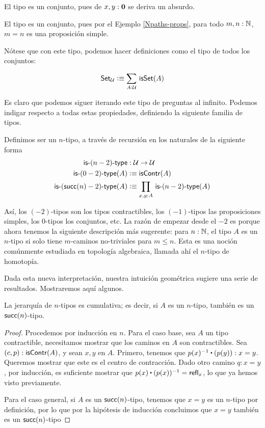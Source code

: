 \documentclass[../main.tex]{subfiles}
\begin{document}
\begin{example}
  El tipo \emptyt es un conjunto, pues de $x,y:\mathbf{0}$ se deriva un absurdo.
\end{example}

\begin{example}
  El tipo \N es un conjunto, pues por el Ejemplo \ref{Npaths-props}, para todo $m,n:\mathbb{N}$, $m=n$ es una proposici\'on simple.
\end{example}

N\'otese que con este tipo, podemos hacer definiciones como el tipo de todos los conjuntos:

\[ \mathsf{Set}_{\UU} \defeq \sm{A:\UU} \isset(A) \]

Es claro que podemos siguer iterando este tipo de preguntas al infinito.
Podemos indigar respecto a todas estas propiedades, definiendo la siguiente familia de tipos.
\begin{definition}
  Definimos ser un $n$-tipo, a trav\'es de recursi\'on en los naturales de la siguiente forma
  \begin{align*}
    \istype{(n-2)}          & : \UU \to \UU                        \\
    \istype{(0-2)}(A)       & \defeq \iscontr(A)                   \\
    \istype{(\suc(n)-2)}(A) & \defeq \prd{x,y:A} \istype{(n-2)}(A)
  \end{align*}
\end{definition}

As\'i, los $(-2)$-tipos son los tipos contractibles, los $(-1)$-tipos las proposiciones simples, los $0$-tipos los conjuntos, etc.
La raz\'on de empezar desde el $-2$ es porque ahora tenemos la siguiente descripci\'on m\'as sugerente: para $n : \mathbb{N}$, el tipo $A$ es un $n$-tipo si solo tiene $m$-caminos no-triviales para $m \leq n$.
Esta es una noci\'on com\'unmente estudiada en topolog\'ia algebraica, llamada ah\'i el $n$-tipo de homotop\'ia.

Dada esta nueva interpretaci\'on, nuestra intuici\'on geom\'etrica sugiere una serie de resultados. Mostraremos aqu\'i algunos.

\begin{proposition}
  La jerarquía de $n$-tipos es cumulativa; es decir, si $A$ es un $n$-tipo, tambi\'en es un $\mathsf{succ}(n)$-tipo.
\end{proposition}
\begin{proof}
  Procedemos por inducci\'on en $n$.
  Para el caso base, sea $A$ un tipo contractible, necesitamos mostrar que los caminos en $A$ son contractibles.
  Sea $(c,p):\mathsf{isContr}(A)$, y sean $x,y$ en $A$. Primero, tenemos que $p(x)^{-1} \ct (p(y)) : x=y$. Queremos mostrar que este es el centro de contracción.
  Dado otro camino $q:x=y$, por inducci\'on, es suficiente mostrar que $p(x) \ct (p(x))^{-1}=\refl{x}$, lo que ya hemos visto previamente.

  Para el caso general, si $A$ es un $\mathsf{succ}(n)$-tipo, tenemos que $x=y$ es un $n$-tipo por definici\'on, por lo que por la hip\'otesis de inducci\'on concluimos que $x=y$ tambi\'en es un $\mathsf{succ}(n)$-tipo
\end{proof}
\end{document}
